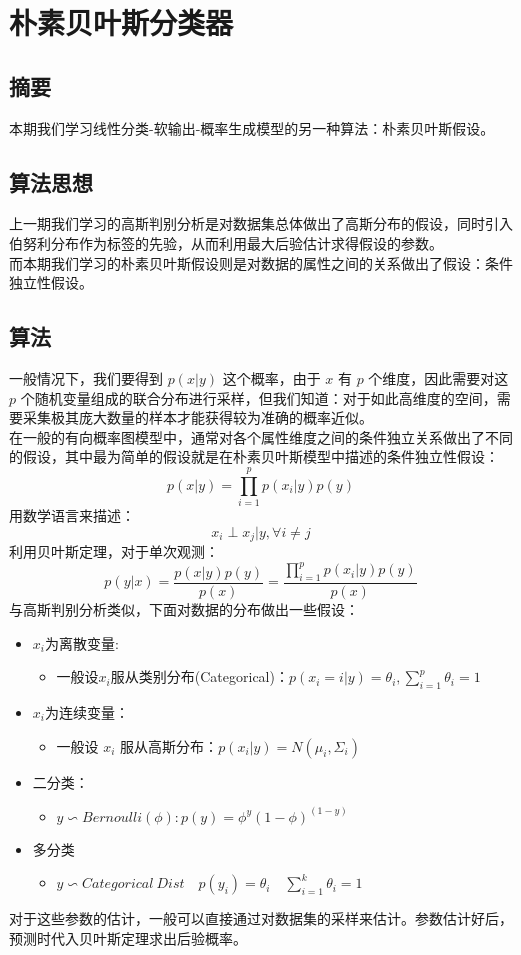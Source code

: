 \documentclass{report}
\begin{document}
\section{朴素贝叶斯分类器}
\subsection{摘要}
本期我们学习线性分类-软输出-概率生成模型的另一种算法：朴素贝叶斯假设。
\subsection{算法思想}
上一期我们学习的高斯判别分析是对数据集总体做出了高斯分布的假设，同时引入伯努利分布作为标签的先验，从而利用最大后验估计求得假设的参数。\\
而本期我们学习的朴素贝叶斯假设则是对数据的属性之间的关系做出了假设：条件独立性假设。
\subsection{算法}
一般情况下，我们要得到 $p(x|y)$ 这个概率，由于 $x$ 有 $p$ 个维度，因此需要对这 $p$ 个随机变量组成的联合分布进行采样，但我们知道：对于如此高维度的空间，需要采集极其庞大数量的样本才能获得较为准确的概率近似。\\
在一般的有向概率图模型中，通常对各个属性维度之间的条件独立关系做出了不同的假设，其中最为简单的假设就是在朴素贝叶斯模型中描述的条件独立性假设：
$$
p(x|y)=\prod_{i=1}^p p(x_i|y)p(y)
$$
用数学语言来描述：
$$
x_{i} \perp x_{j} | y, \forall i \neq j
$$
利用贝叶斯定理，对于单次观测：
$$
p(y|x)=\frac{p(x|y)p(y)}{p(x)}=\frac{\prod_{i=1}^p p(x_i|y)p(y)}{p(x)}
$$
与高斯判别分析类似，下面对数据的分布做出一些假设：
\begin{itemize}
	\item $x_i$为离散变量:
	\begin{itemize}
	\item 一般设$x_i$服从类别分布(Categorical)：$p(x_i=i|y)=\theta_i,\sum_{i=1}^p \theta_i =1$
	\end{itemize}
	\item $x_i$为连续变量：
	\begin{itemize}
	\item 一般设 $x_i$ 服从高斯分布：$p(x_i|y)=N(\mu_i, \Sigma_i)$
	\end{itemize}
	\item 二分类：	
	\begin{itemize}
	\item $y \backsim Bernoulli(\phi):p(y)=\phi^y (1-\phi)^{(1-y)}$ 
	\end{itemize}
	\item 多分类
	\begin{itemize}
	\item $y \backsim Categorical\ Dist\quad p(y_i)=\theta_i\quad \sum_{i=1}^k \theta_i=1$
	\end{itemize}
\end{itemize}
对于这些参数的估计，一般可以直接通过对数据集的采样来估计。参数估计好后，预测时代入贝叶斯定理求出后验概率。
\end{document}

